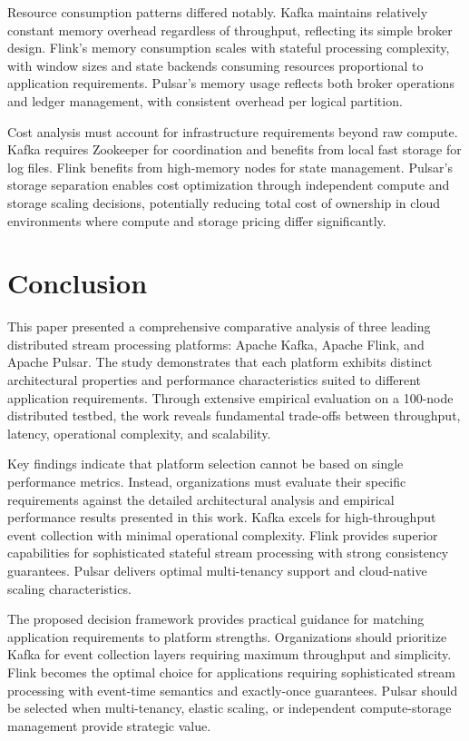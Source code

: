 \documentclass[10pt,twocolumn]{article}
\begin{document}
Resource consumption patterns differed notably. Kafka maintains relatively constant memory overhead regardless of throughput, reflecting its simple broker design. Flink's memory consumption scales with stateful processing complexity, with window sizes and state backends consuming resources proportional to application requirements. Pulsar's memory usage reflects both broker operations and ledger management, with consistent overhead per logical partition.

Cost analysis must account for infrastructure requirements beyond raw compute. Kafka requires Zookeeper for coordination and benefits from local fast storage for log files. Flink benefits from high-memory nodes for state management. Pulsar's storage separation enables cost optimization through independent compute and storage scaling decisions, potentially reducing total cost of ownership in cloud environments where compute and storage pricing differ significantly.

\section{Conclusion}

This paper presented a comprehensive comparative analysis of three leading distributed stream processing platforms: Apache Kafka, Apache Flink, and Apache Pulsar. The study demonstrates that each platform exhibits distinct architectural properties and performance characteristics suited to different application requirements. Through extensive empirical evaluation on a 100-node distributed testbed, the work reveals fundamental trade-offs between throughput, latency, operational complexity, and scalability.

Key findings indicate that platform selection cannot be based on single performance metrics. Instead, organizations must evaluate their specific requirements against the detailed architectural analysis and empirical performance results presented in this work. Kafka excels for high-throughput event collection with minimal operational complexity. Flink provides superior capabilities for sophisticated stateful stream processing with strong consistency guarantees. Pulsar delivers optimal multi-tenancy support and cloud-native scaling characteristics.

The proposed decision framework provides practical guidance for matching application requirements to platform strengths. Organizations should prioritize Kafka for event collection layers requiring maximum throughput and simplicity. Flink becomes the optimal choice for applications requiring sophisticated stream processing with event-time semantics and exactly-once guarantees. Pulsar should be selected when multi-tenancy, elastic scaling, or independent compute-storage management provide strategic value.
\end{document}
